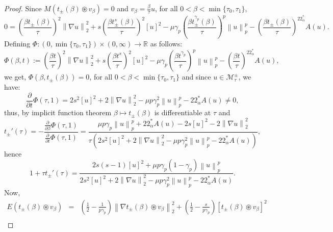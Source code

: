 \documentclass[11pt]{article}
\numberwithin{equation}{section}
\numberwithin{mytheorem}{section}
\begin{document}
		\begin{proof}
			Since $M(t_{\pm}(\beta)\circledast v_{\beta})=0$ and $v_{\beta}=\frac{\beta}{\tau}u$, for all $0<\beta<\min\{\tau_0,\tau_1\}$,
			\begin{equation*}
				0 = 
				\left(\frac{\beta t_{\pm}(\beta)}{\tau}\right)^2\left\| \nabla u \right\|_2^2+s\left(\frac{\beta t_{\pm}^s(\beta)}{\tau}\right)^2[u]^2-\mu\gamma_p\left(\frac{\beta t_{\pm}^{\gamma_p}(\beta)}{\tau}\right)^p\left\| u \right\|_p^p-\left(\frac{\beta t_{\pm}(\beta)}{\tau}\right)^{22^*_{\alpha}}A(u).
			\end{equation*}
			Defining $\Phi: (0,\min\{\tau_0,\tau_1\})\times (0,\infty)\rightarrow \mathbb{R}$ as follows:
			$$\Phi(\beta, t):=				\left(\frac{\beta t}{\tau}\right)^2\left\| \nabla u \right\|_2^2+s\left(\frac{\beta t^s}{\tau}\right)^2[u]^2-\mu\gamma_p\left(\frac{\beta t^{\gamma_p}}{\tau}\right)^p\left\| u \right\|_p^p-\left(\frac{\beta t}{\tau}\right)^{22^*_{\alpha}}A(u),$$
			we get, $\Phi(\beta,t_{\pm}(\beta))=0$, for all $0<\beta<\min\{\tau_0,\tau_1\}$ and since $u\in \mathcal{M}_{\tau}^{\pm}$, we have:
			$$\frac{\partial}{\partial t}\Phi(\tau,1)= 2s^2[u]^2+2\left\| \nabla u \right\|_2^2-\mu p\gamma_p^2\left\| u \right\|_p^p-22^*_{\alpha}A(u)\neq 0,$$
			thus, by implicit function theorem $\beta\mapsto t_{\pm}(\beta)$ is differentiable at $\tau$ and 
			\begin{equation*}
				t_{\pm}'(\tau)=-\frac{\frac{\partial }{\partial \beta}\Phi(\tau,1)}{\frac{\partial}{\partial t}\Phi(\tau,1)}=\frac{\mu p\gamma_p\left\| u \right\|_p^p+22^*_{\alpha}A(u)-2s[u]^2-2\left\| \nabla u \right\|_2^2}{\tau\left(2s^2[u]^2+2\left\| \nabla u \right\|_2^2-\mu p\gamma_p^2\left\| u \right\|_p^p-22^*_{\alpha}A(u)\right)},
			\end{equation*}
			hence
			\begin{equation}\label{4.18}
				1+\tau t_{\pm}'(\tau)=\frac{2s(s-1)[u]^2+\mu p\gamma_p(1-\gamma_p)\left\| u \right\|_p^p}{2s^2[u]^2+2\left\| \nabla u \right\|_2^2-\mu p\gamma_p^2\left\| u \right\|_p^p-22^*_{\alpha}A(u)}.
			\end{equation}
			Now, 
			\begin{eqnarray*}
				E(t_{\pm}(\beta)\circledast v_{\beta}) & = & \left(\frac{1}{2}-\frac{1}{p\gamma_p}\right)\left\| \nabla t_{\pm}(\beta)\circledast v_{\beta} \right\|_2^2+\left(\frac{1}{2}-\frac{s}{p\gamma_p}\right)[t_{\pm}(\beta)\circledast v_{\beta}]^2\\

\end{eqnarray*}
\end{proof}
\end{document}
